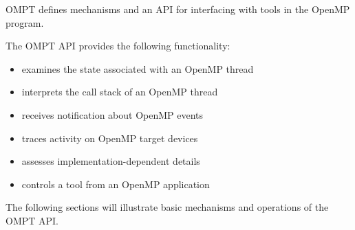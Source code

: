 \label{chap:ompt_interface}
OMPT defines mechanisms and an API for interfacing with tools in the OpenMP program.

The OMPT API provides the following functionality:
\begin{itemize}
  \addtolength{\itemindent}{1cm}
  \item  examines the state associated with an OpenMP thread
  \item  interprets the call stack of an OpenMP thread
  \item  receives notification about OpenMP events
  \item  traces activity on OpenMP target devices
  \item  assesses implementation-dependent details
  \item  controls a tool from an OpenMP application
\end{itemize}

The following sections will illustrate basic mechanisms and operations of the OMPT API.



